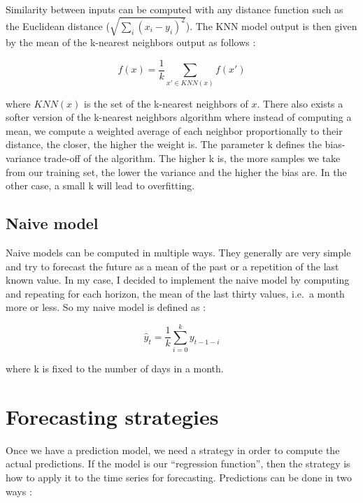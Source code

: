 \documentclass[11pt,a4paper,oneside]{book}
\begin{document}
Similarity between inputs can be computed with any distance function such as the Euclidean distance ($\sqrt{\sum_i \left (  x_i - y_i \right )^{2}}$). The KNN model output is then given by the mean of the k-nearest neighbors output as follows :


\begin{equation}
f\left ( x \right ) = \frac{1}{k}\sum_{x' \in KNN(x) } f\left ( x' \right )
\end{equation}

where $KNN(x)$ is the set of the k-nearest neighbors of $x$. There also exists a softer version of the k-nearest neighbors algorithm where instead of computing a mean, we compute a weighted average of each neighbor proportionally to their distance, the closer, the higher the weight is. The parameter k defines the bias-variance trade-off of the algorithm. The higher k is, the more samples we take from our training set, the lower the variance and the higher the bias are. In the other case, a small k will lead to overfitting. \cite{navot}



\subsection{Naive model}

Naive models can be computed in multiple ways. They generally are very simple and try to forecast the future as a mean of the past or a repetition of the last known value. In my case, I decided to implement the naive model by computing and repeating for each horizon, the mean of the last thirty values, i.e.\ a month more or less. So my naive model is defined as : 

\begin{equation}
\hat{y}_t = \frac{1}{k} \sum_{i=0}^{k} y_{t-1-i}
\end{equation}

where k is fixed to the number of days in a month.


\section{Forecasting strategies}\label{strat}

Once we have a prediction model, we need a strategy in order to compute the actual predictions. If the model is our ``regression function'', then the strategy is how to apply it to the time series for forecasting. Predictions can be done in two ways :
\end{document}
